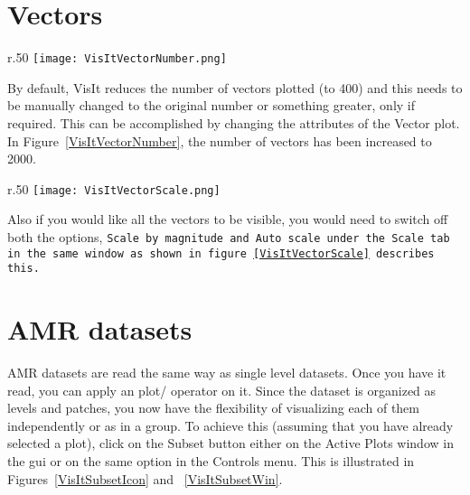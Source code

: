 \section{Vectors}

\begin{wrapfigure}{r}{.50\textwidth}
  \center
  \vspace{-40pts}
  \texttt{[image: VisItVectorNumber.png]}
  \caption{Increasing the number of Vectors}
  \vspace{-20pts}
  \label{VisItVectorNumber}
\end{wrapfigure}


By default, VisIt reduces the number of vectors plotted (to 400) and
this needs to be manually changed to the original number or something
greater, only if required.  This can be accomplished by changing the
attributes of the Vector plot. In Figure~\ref{VisItVectorNumber}, the
number of vectors has been increased to 2000.


\begin{wrapfigure}{r}{.50\textwidth}
  \center
  \vspace{-50pts}
  \texttt{[image: VisItVectorScale.png]}
  \caption{Increasing the scale of Vectors}
  \vspace{-30pts}
  \label{VisItVectorScale}
\end{wrapfigure}


Also if you would like all the vectors to be visible, you would need
to switch off both the options, \tt Scale by magnitude \normalfont and
\tt Auto scale \normalfont under the Scale tab in the same window as
shown in figure~\ref{VisItVectorScale} describes this.


\section{AMR datasets}



AMR datasets are read the same way as single level datasets. Once you
have it read, you can apply an plot/ operator on it. Since the dataset
is organized as levels and patches, you now have the flexibility of
visualizing each of them independently or as in a group. To achieve
this (assuming that you have already selected a plot), click on the
Subset button either on the Active Plots window in the gui or on the
same option in the Controls menu. This is illustrated in
Figures~\ref{VisItSubsetIcon} and ~\ref{VisItSubsetWin}.


